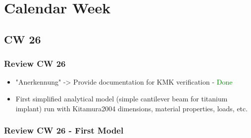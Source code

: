 \section{Calendar Week}
\subsection{CW 26}
\begin{frame}
  \frametitle{Review CW 26}
	\begin{itemize}
		\item "Anerkennung" -> Provide documentation for KMK verification - \textcolor{green}{Done} 
		\item First simplified analytical model (simple cantilever beam for titanium implant) run with Kitamura2004 dimensions, material properties, loads, etc.
	\end{itemize}
\end{frame}

\begin{frame}
  \frametitle{Review CW 26 - First Model}
	\begin{figure}
	\end{figure}
\end{frame}
